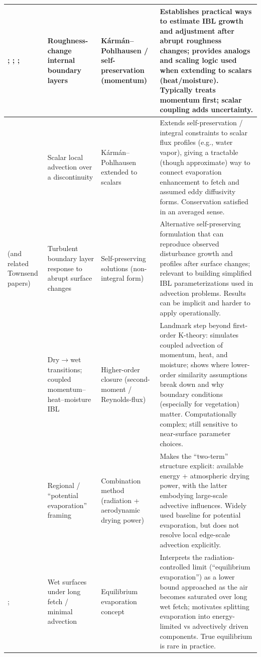 \documentclass{article}
\begin{document}
\begin{table}[htbp]
\begin{tabular}{p{3.2cm}|p{3.5cm}|p{3.5cm}|p{6.0cm}}
    \hline
    \citet{elliott1958}; \citet{panofskyTownsend1964}; \citet{plateHidy1967}; \citet{lettauZabransky1968} & Roughness-change internal boundary layers & K\'arm\'an--Pohlhausen / self-preservation (momentum) & Establishes practical ways to estimate IBL growth and adjustment after abrupt roughness changes; provides analogs and scaling logic used when extending to scalars (heat/moisture). Typically treats momentum first; scalar coupling adds uncertainty. \\
    \hline
    \citet{itierPerrier1976} & Scalar local advection over a discontinuity & K\'arm\'an--Pohlhausen extended to scalars & Extends self-preservation / integral constraints to scalar flux profiles (e.g., water vapor), giving a tractable (though approximate) way to connect evaporation enhancement to fetch and assumed eddy diffusivity forms. Conservation satisfied in an averaged sense. \\
    \hline
    \citet{townsend1965self} (and related Townsend papers) & Turbulent boundary layer response to abrupt surface changes & Self-preserving solutions (non-integral form) & Alternative self-preserving formulation that can reproduce observed disturbance growth and profiles after surface changes; relevant to building simplified IBL parameterizations used in advection problems. Results can be implicit and harder to apply operationally. \\
    \hline
    \citet{rao1974local} & Dry$\rightarrow$wet transitions; coupled momentum--heat--moisture IBL & Higher-order closure (second-moment / Reynolds-flux) & Landmark step beyond first-order K-theory: simulates coupled advection of momentum, heat, and moisture; shows where lower-order similarity assumptions break down and why boundary conditions (especially for vegetation) matter. Computationally complex; still sensitive to near-surface parameter choices. \\
    \hline
    \citet{penman1948} & Regional / “potential evaporation” framing & Combination method (radiation + aerodynamic drying power) & Makes the “two-term” structure explicit: available energy + atmospheric drying power, with the latter embodying large-scale advective influences. Widely used baseline for potential evaporation, but does not resolve local edge-scale advection explicitly. \\
    \hline
    \citet{slatyerMcIlroy1961}; \citet{priestley1959} & Wet surfaces under long fetch / minimal advection & Equilibrium evaporation concept & Interprets the radiation-controlled limit (“equilibrium evaporation”) as a lower bound approached as the air becomes saturated over long wet fetch; motivates splitting evaporation into energy-limited vs advectively driven components. True equilibrium is rare in practice. \\

\end{tabular}
\end{table}
\end{document}
